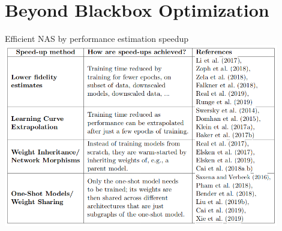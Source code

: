 \section{Beyond Blackbox Optimization}
\begin{frame}[c]{Efficient NAS by performance estimation speedup}
\centering
\includegraphics[width=0.9\textwidth]{images_lec7/performance_estimation.png}\\
\end{frame}
